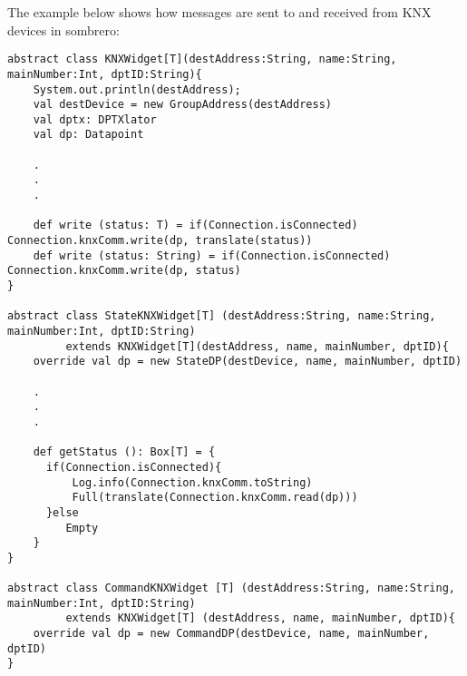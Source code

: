 The example below shows how messages are sent to and received from KNX devices in sombrero:
\begin{lstlisting}[caption=Calimero write to device: Widget.scala,label=lst:calimero:write]
abstract class KNXWidget[T](destAddress:String, name:String, mainNumber:Int, dptID:String){
	System.out.println(destAddress);
    val destDevice = new GroupAddress(destAddress)
    val dptx: DPTXlator
    val dp: Datapoint

    .
    .
    .

	def write (status: T) = if(Connection.isConnected) Connection.knxComm.write(dp, translate(status))
	def write (status: String) = if(Connection.isConnected) Connection.knxComm.write(dp, status)
}

abstract class StateKNXWidget[T] (destAddress:String, name:String, mainNumber:Int, dptID:String)
		 extends KNXWidget[T](destAddress, name, mainNumber, dptID){
    override val dp = new StateDP(destDevice, name, mainNumber, dptID)

    .
    .
    .

	def getStatus (): Box[T] = {
	  if(Connection.isConnected){
		  Log.info(Connection.knxComm.toString)
		  Full(translate(Connection.knxComm.read(dp)))
	  }else
         Empty
	}
}

abstract class CommandKNXWidget [T] (destAddress:String, name:String, mainNumber:Int, dptID:String)
		 extends KNXWidget[T] (destAddress, name, mainNumber, dptID){
    override val dp = new CommandDP(destDevice, name, mainNumber, dptID)
}
\end{lstlisting}
